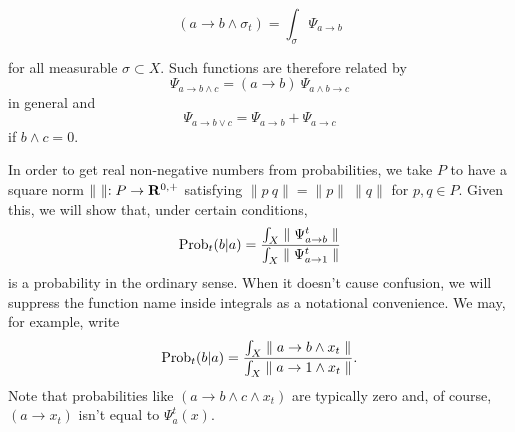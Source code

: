 \documentclass[12pt]{article}
\begin{document}
\begin{equation}
(a\rightarrow b\wedge \sigma_t) = \int_{\sigma} \Psi_{a\rightarrow b}
\end{equation}

\noindent for all measurable $\sigma\subset X$. 
Such functions are therefore related by 
\begin{equation}
\Psi_{a\rightarrow b\wedge c} = (a\rightarrow b)\ \Psi_{a\wedge b\rightarrow c}
\end{equation}
in general and 
\begin{equation}
\Psi_{a\rightarrow b\vee c} = \Psi_{a\rightarrow b} + \Psi_{a\rightarrow c}
\end{equation}
if $b\wedge c=0$.

In order to get real non-negative numbers from probabilities, we take $P$ to have
a square norm $\parallel\ \parallel:P\rightarrow {\bf R}^{0,+}$ satisfying
$\parallel p\ q\parallel=\parallel p\parallel\ \parallel q\parallel$ for $p,q\in P$.
Given this, we will show that, under certain conditions, 
\begin{equation}
{\rm Prob}_t(b|a)= {{\int_X \parallel \Psi^t_{a\rightarrow b}\parallel}\over{\int_X \parallel
\Psi^t_{a\rightarrow 1}\parallel}}
\end{equation}
is a probability in the ordinary sense.
When it doesn't cause confusion, we will
suppress the function name inside integrals as a notational convenience.
We may, for example, write 
\begin{equation}
{\rm Prob}_t(b|a)=
{{\int_{X} \parallel a\rightarrow b\wedge x_t \parallel}\over{\int_{X} \parallel a\rightarrow 1\wedge x_t \parallel}}.
\end{equation}
Note that probabilities like $(a\rightarrow b\wedge c\wedge x_t)$ are typically zero and, of course, 
$(a\rightarrow x_t)$ isn't equal to $\Psi^t_{a}(x)$.
\end{document}
